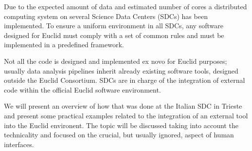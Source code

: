 \documentclass{report}
\begin{document}
Due to the expected amount of data and estimated number of cores a distributed computing system on several Science Data Centers (SDCs) has been implemented. To ensure a uniform environment in all SDCs, any software designed for Euclid must comply with a set of common rules and must be implemented in a predefined framework. 

Not all the code is designed and implemented ex novo for Euclid purposes; usually data analysis pipelines inherit already existing software tools, designed outside the Euclid Consortium. SDCs are in charge of the integration of external code within the official Euclid software environment. 

We will present an overview of how that was done at the Italian SDC in Trieste and present some practical examples related to the integration of an external tool into the Euclid environent. The topic will be discussed taking into account the technicality and focused on the crucial, but usually ignored, aspect of human interfaces.\newline
\newpage
\end{document}
